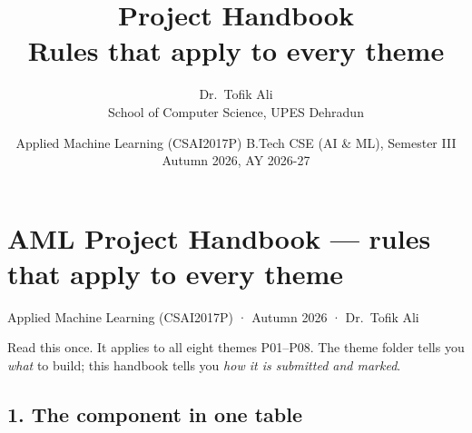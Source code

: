 \documentclass[11pt]{article}
\title{Project Handbook\\[4pt]\large Rules that apply to every theme}
\author{Dr.\ Tofik Ali \\ School of Computer Science, UPES Dehradun}
\date{Applied Machine Learning (CSAI2017P) \quad\textbullet\quad B.Tech CSE (AI \& ML), Semester III \\[2pt] Autumn 2026, AY 2026-27}
\begin{document}
\maketitle
\tableofcontents
\newpage

\hypertarget{aml-project-handbook-rules-that-apply-to-every-theme}{%
\section{AML Project Handbook --- rules that apply to every theme}\label{aml-project-handbook-rules-that-apply-to-every-theme}}

Applied Machine Learning (CSAI2017P) · Autumn 2026 · Dr.~Tofik Ali

Read this once. It applies to all eight themes P01--P08. The theme folder tells you
\emph{what} to build; this handbook tells you \emph{how it is submitted and marked}.



\hypertarget{the-component-in-one-table}{%
\subsection{1. The component in one table}\label{the-component-in-one-table}}
\end{document}
